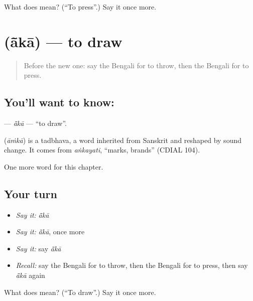 \begin{tcolorbox}[breakable,colback=teal!4,colframe=teal!35!black,title={Before you move on}]
What does  mean? (\textquotedblleft{}To press\textquotedblright{}.) Say it once more.
\end{tcolorbox}
\section[\texorpdfstring{\bn{আঁকা} (ā̃kā)}{আঁকা (ā̃kā)}]{ (ā̃kā) — to draw}

\label{lesson:BN-C106-aka}



\begin{quote}
Before the new one: say the Bengali for to throw, then the Bengali for to press.
\end{quote}

\subsection*{You'll want to know: }
\textbf{} — \emph{ā̃kā} — \textquotedblleft{}to draw\textquotedblright{}.

\begin{cousinweb}
\textbf{} (\emph{āṁkā}) is a tadbhava, a word inherited from Sanskrit and reshaped by sound change. It comes from \emph{aṅkayati}, \textquotedblleft{}marks, brands\textquotedblright{} (CDIAL 104).
\end{cousinweb}

\begin{grammarlens}[title={What you've built}]
One more word for this chapter.
\end{grammarlens}

\subsection*{Your turn}
\begin{itemize}
\raggedright
  \item \emph{Say it:} \emph{ā̃kā}
  \item \emph{Say it:} \emph{ā̃kā}, once more
  \item \emph{Say it:} say \emph{ā̃kā}
  \item \emph{Recall:} say the Bengali for to throw, then the Bengali for to press, then say \emph{ā̃kā} again
\end{itemize}

\begin{tcolorbox}[breakable,colback=teal!4,colframe=teal!35!black,title={Before you move on}]
What does  mean? (\textquotedblleft{}To draw\textquotedblright{}.) Say it once more.
\end{tcolorbox}

